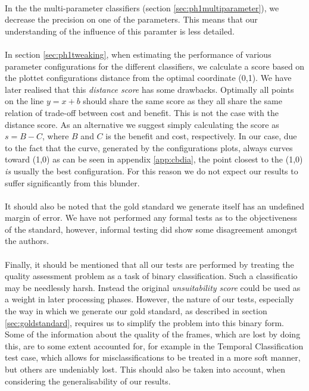 \\
In the the multi-parameter classifiers (section \ref{sec:ph1multiparameter}), we decrease the precision on one of the parameters. This means that our understanding of the influence of this paramter is less detailed.\\
\\
In section \ref{sec:ph1tweaking}, when estimating the performance of various parameter configurations for the different classifiers, we calculate a score based on the plottet configurations distance from the optimal coordinate (0,1). We have later realised that this \textit{distance score} has some drawbacks. Optimally all points on the line $y = x + b$ should share the same score as they all share the same relation of trade-off between cost and benefit. This is not the case with the distance score. As an alternative we suggest simply calculating the score as $s = B - C$, where $B$ and $C$ is the benefit and cost, respectively. In our case, due to the fact that the curve, generated by the configurations plots, always curves toward (1,0) as can be seen in appendix \ref{app:cbdia}, the point closest to the (1,0) \textit{is} usually the best configuration. For this reason we do not expect our results to suffer significantly from this blunder.\\ %
\\
It should also be noted that the gold standard we generate itself has an undefined margin of error. We have not performed any formal tests as to the objectiveness of the standard, however, informal testing did show some disagreement amongst the authors.\\
\\
Finally, it should be mentioned that all our tests are performed by treating the quality assessment problem as a task of binary classification. Such a classificatio may be needlessly harsh. Instead the original \textit{unsuitability score} could be used as a weight in later processing phases. However, the nature of our tests, especially the way in which we generate our gold standard, as described in section \ref{sec:goldstandard}, requires us to simplify the problem into this binary form. Some of the information about the quality of the frames, which are lost by doing this, are to some extent accounted for, for example in the Temporal Classification test case, which allows for misclassifications to be treated in a more soft manner, but others are undeniably lost. This should also be taken into account, when considering the generalisability of our results.
%
